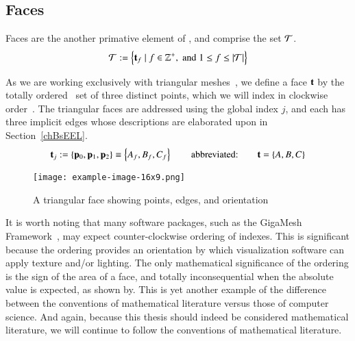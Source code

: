 \subsection{Faces}
\label{chBsF}
Faces are the another primative element of \tdd{}, and comprise the set $\mathcal{T}$.
\begin{equation}
	\mathcal{T} := \left \{\mathbf{t}_f \mid f \in \mathbb{Z}^+, \;\text{and}\; 1\leq f \leq|\mathcal{T}| \right \}
	\label{eq:defineSetOfFaces}
\end{equation}%
%
%
%

As we are working exclusively with triangular meshes~\cite[p.~26]{Mara12}, we define a face $\mathbf{t}$ by the totally ordered~\cite{Weisstein19a} set of three distinct points, which we will index in clockwise order~\cite[p.~4]{Mara17}. The triangular faces are addressed using the global index $j$, and each has three implicit edges whose descriptions are elaborated upon in Section~\ref{chBsEEL}.
\begin{equation}
	\mathbf{t}_j := \left \{\mathbf{p}_0, \mathbf{p}_1, \mathbf{p}_2\right \} \equiv \left \{A_f, B_f, C_f\right \} \hspace{20pt}\text{abbreviated:}\hspace{20pt} \mathbf{t} = \left \{A, B, C\right \}
	\label{eq:defineSetOfFaces}
\end{equation}%
%
%

\begin{figure}[ht]
\ffigbox
	{\texttt{[image: example-image-16x9.png]}}
	{\caption[A Triangular Face]{A triangular face showing points, edges, and orientation}\label{fig:facesOfAMesh}}
\end{figure}%

It is worth noting that many software packages, such as the GigaMesh Framework~\cite[p.~89]{Mara12}, may expect counter-clockwise ordering of indexes.  This is significant because the ordering provides an orientation by which visualization software can apply texture and/or lighting. The only mathematical significance of the ordering is the sign of the area of a face, and totally inconsequential when the absolute value is expected, as shown by\cite[p.~2]{Braden86}. This is yet another example of the difference between the conventions of mathematical literature versus those of computer science. And again, because this thesis should indeed be considered mathematical literature, we will continue to follow the conventions of mathematical literature.
%
